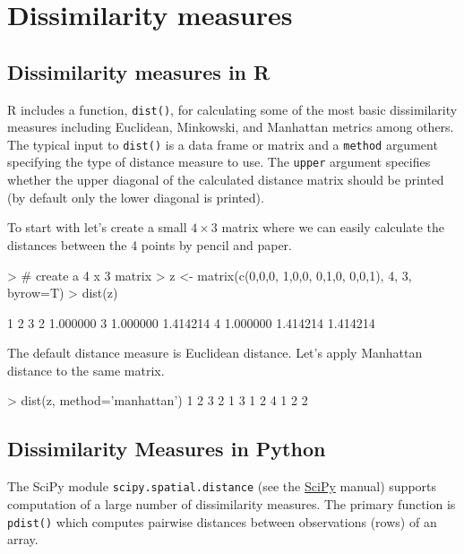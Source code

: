

\section{Dissimilarity measures}
\label{sec-1}

\subsection{Dissimilarity measures in R}
\label{sec-1-1}

R includes a function, \verb~dist()~, for calculating some of the most basic dissimilarity measures including Euclidean, Minkowski, and Manhattan metrics among others. The typical input to \verb~dist()~ is a data frame or matrix and a \verb~method~ argument specifying the type of distance measure to use. The \verb~upper~ argument specifies whether the upper diagonal of the calculated distance matrix should be printed (by default only the lower diagonal is printed).

To start with let's create a small $4 \times 3$ matrix where we can easily calculate the distances between the 4 points by pencil and paper.

\begin{R}
> # create a 4 x 3 matrix
> z <- matrix(c(0,0,0,
                1,0,0,
                0,1,0,
                0,0,1), 4, 3, byrow=T)
> dist(z)

         1        2        3
2 1.000000                  
3 1.000000 1.414214         
4 1.000000 1.414214 1.414214
\end{R}

The default distance measure is Euclidean distance.  Let's apply Manhattan distance to the same matrix.

\begin{R}
> dist(z, method='manhattan')
  1 2 3
2 1    
3 1 2  
4 1 2 2
\end{R}

\subsection{Dissimilarity Measures in Python}
\label{sec-1-2}

The SciPy module \verb~scipy.spatial.distance~ (see the \href{http://docs.scipy.org/doc/scipy-0.14.0/reference/spatial.distance.html}{SciPy} manual) supports computation of a large number of dissimilarity measures. The primary function is \verb~pdist()~ which computes pairwise distances between observations (rows) of an array.

